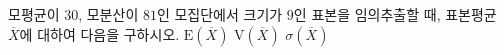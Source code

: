 모평균이 $30$, 모분산이 $81$인 모집단에서 크기가 $9$인 표본을 임의추출할 때, 표본평균 $\overline{X}$에 대하여 다음을 구하시오.
 $\mathrm{E}(\overline{X})$
 $\mathrm{V}(\overline{X})$
 $\sigma(\overline{X})$
